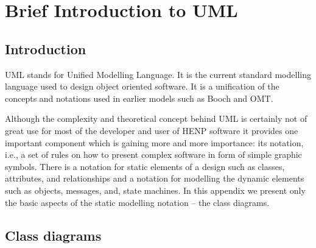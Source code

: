 \documentclass[twoside]{article}
\begin{document}
%
%
\appendix
\section{Brief Introduction to UML}
\label{sec:introUML}

\subsection{Introduction}
UML stands for Unified Modelling Language. It is the current standard
modelling language used to design object oriented software. It is a
unification of the concepts and notations used in earlier models such
as Booch and OMT.

Although the complexity and theoretical concept behind UML is
certainly not of great use for most of the developer and user of HENP
software it provides one important component which is gaining more and
more importance: its notation, i.e., a set of rules on how to present
complex software in form of simple graphic symbols.  There is a
notation for static elements of a design such as classes, attributes,
and relationships and a notation for modelling the dynamic elements
such as objects, messages, and, state machines. In this appendix we
present only the basic aspects of the static modelling notation -- the
class diagrams.   

\subsection{Class diagrams}
\end{document}
